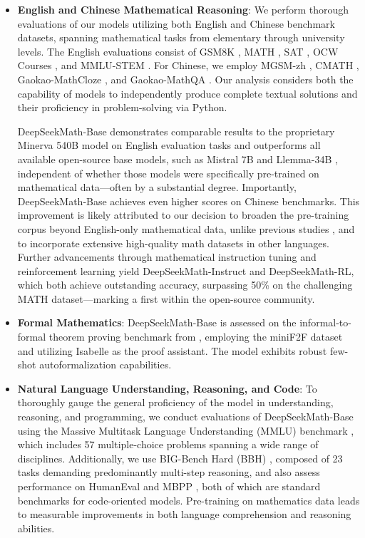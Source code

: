 \begin{itemize}[topsep=0pt]
    \item \textbf{English and Chinese Mathematical Reasoning}: We perform thorough evaluations of our models utilizing both English and Chinese benchmark datasets, spanning mathematical tasks from elementary through university levels. The English evaluations consist of GSM8K \citep{gsm8k}, MATH \citep{MATH}, SAT \citep{llemma}, OCW Courses \citep{minerva}, and MMLU-STEM \citep{mmlu}. For Chinese, we employ MGSM-zh \citep{mgsm}, CMATH \citep{wei2023cmath}, Gaokao-MathCloze \citep{agieval}, and Gaokao-MathQA \citep{agieval}. Our analysis considers both the capability of models to independently produce complete textual solutions and their proficiency in problem-solving via Python.

DeepSeekMath-Base demonstrates comparable results to the proprietary Minerva 540B model \citep{minerva} on English evaluation tasks and outperforms all available open-source base models, such as Mistral 7B \citep{mistral} and Llemma-34B \citep{llemma}, independent of whether those models were specifically pre-trained on mathematical data—often by a substantial degree. Importantly, DeepSeekMath-Base achieves even higher scores on Chinese benchmarks. This improvement is likely attributed to our decision to broaden the pre-training corpus beyond English-only mathematical data, unlike previous studies \citep{minerva,llemma}, and to incorporate extensive high-quality math datasets in other languages. Further advancements through mathematical instruction tuning and reinforcement learning yield DeepSeekMath-Instruct and DeepSeekMath-RL, which both achieve outstanding accuracy, surpassing 50\% on the challenging MATH dataset—marking a first within the open-source community.

\item \textbf{Formal Mathematics}: DeepSeekMath-Base is assessed on the informal-to-formal theorem proving benchmark from \citep{dsp_proof}, employing the miniF2F dataset \citep{minif2f} and utilizing Isabelle \citep{isabelle} as the proof assistant. The model exhibits robust few-shot autoformalization capabilities.
\item \textbf{Natural Language Understanding, Reasoning, and Code}: To thoroughly gauge the general proficiency of the model in understanding, reasoning, and programming, we conduct evaluations of DeepSeekMath-Base using the Massive Multitask Language Understanding (MMLU) benchmark \citep{mmlu}, which includes 57 multiple-choice problems spanning a wide range of disciplines. Additionally, we use BIG-Bench Hard (BBH) \citep{bbh}, composed of 23 tasks demanding predominantly multi-step reasoning, and also assess performance on HumanEval \citep{codex} and MBPP \citep{mbpp}, both of which are standard benchmarks for code-oriented models. Pre-training on mathematics data leads to measurable improvements in both language comprehension and reasoning abilities.


\end{itemize}
